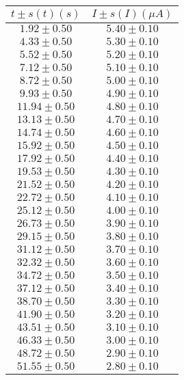 \documentclass[12pt, letterpaper]{article} %
\theoremstyle{plain} %
\begin{document}
\vspace*{-2.5cm}
\begin{figure}[H]
\centering
\footnotesize
\begin{minipage}[t]{0.48\textwidth}
\centering
\begin{minipage}[t]{\linewidth}
\centering
\setlength{\arrayrulewidth}{1.2pt}
\begin{tabular}{|c|c|}
\hline
$t \pm s(t) (s)$ & $I \pm s(I) (\mu A)$ \\
\hline
$1.92 \pm 0.50$ & $5.40 \pm 0.10$ \\
$4.33 \pm 0.50$ & $5.30 \pm 0.10$ \\
$5.52 \pm 0.50$ & $5.20 \pm 0.10$ \\
$7.12 \pm 0.50$ & $5.10 \pm 0.10$ \\
$8.72 \pm 0.50$ & $5.00 \pm 0.10$ \\
$9.93 \pm 0.50$ & $4.90 \pm 0.10$ \\
$11.94 \pm 0.50$ & $4.80 \pm 0.10$ \\
$13.13 \pm 0.50$ & $4.70 \pm 0.10$ \\
$14.74 \pm 0.50$ & $4.60 \pm 0.10$ \\
$15.92 \pm 0.50$ & $4.50 \pm 0.10$ \\
$17.92 \pm 0.50$ & $4.40 \pm 0.10$ \\
$19.53 \pm 0.50$ & $4.30 \pm 0.10$ \\
$21.52 \pm 0.50$ & $4.20 \pm 0.10$ \\
$22.72 \pm 0.50$ & $4.10 \pm 0.10$ \\
$25.12 \pm 0.50$ & $4.00 \pm 0.10$ \\
$26.73 \pm 0.50$ & $3.90 \pm 0.10$ \\
$29.15 \pm 0.50$ & $3.80 \pm 0.10$ \\
$31.12 \pm 0.50$ & $3.70 \pm 0.10$ \\
$32.32 \pm 0.50$ & $3.60 \pm 0.10$ \\
$34.72 \pm 0.50$ & $3.50 \pm 0.10$ \\
$37.12 \pm 0.50$ & $3.40 \pm 0.10$ \\
$38.70 \pm 0.50$ & $3.30 \pm 0.10$ \\
$41.90 \pm 0.50$ & $3.20 \pm 0.10$ \\
$43.51 \pm 0.50$ & $3.10 \pm 0.10$ \\
$46.33 \pm 0.50$ & $3.00 \pm 0.10$ \\
$48.72 \pm 0.50$ & $2.90 \pm 0.10$ \\
$51.55 \pm 0.50$ & $2.80 \pm 0.10$ \\

\end{tabular}
\end{minipage}
\end{minipage}
\end{figure}
\end{document}
